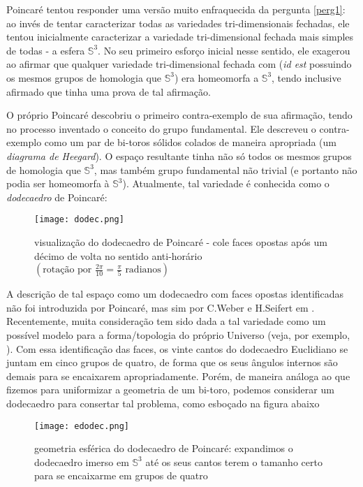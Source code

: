 Poincaré tentou responder uma versão muito enfraquecida da pergunta \cref{perg1}: ao invés de tentar caracterizar todas as variedades tri-dimensionais fechadas, ele tentou inicialmente caracterizar a variedade tri-dimensional fechada mais simples de todas - a esfera $\mathbb{S}^3$. No seu primeiro esforço inicial nesse sentido, ele exagerou ao afirmar que qualquer variedade tri-dimensional fechada com  (\emph{id est} possuindo os mesmos grupos de homologia que $\mathbb{S}^3$) era homeomorfa a $\mathbb{S}^3$, tendo inclusive afirmado que tinha uma prova de tal afirmação. \par 
O próprio Poincaré descobriu o primeiro contra-exemplo de sua afirmação, tendo no processo inventado o conceito do grupo fundamental.  Ele descreveu o contra-exemplo como um par de bi-toros sólidos colados de maneira apropriada (um \emph{diagrama de Heegard}). O espaço resultante tinha não só todos os mesmos grupos de homologia que $\mathbb{S}^3$, mas também grupo fundamental não trivial (e portanto não podia ser homeomorfa à $\mathbb{S}^3$). Atualmente, tal variedade é conhecida como o \emph{dodecaedro} de Poincaré: 
\begin{figure}[H]
\centering
\texttt{[image: dodec.png]}
\caption{visualização do dodecaedro de Poincaré - cole faces opostas após um décimo de volta no sentido anti-horário $\left(\text{rotação por $\frac{2 \pi}{10} = \frac{\pi}{5}$ radianos} \right)$}
\end{figure}
A descrição de tal espaço como um dodecaedro com faces opostas identificadas não foi introduzida por Poincaré, mas sim por C.Weber e H.Seifert em . Recentemente, muita consideração tem sido dada a tal variedade como um possível modelo para a forma/topologia do próprio Universo (veja, por exemplo, ). Com essa identificação das faces, os vinte cantos do dodecaedro Euclidiano se juntam em cinco grupos de quatro, de forma que os seus ângulos internos são  demais para se encaixarem apropriadamente. Porém, de maneira análoga ao que fizemos para uniformizar a geometria de um bi-toro, podemos considerar um dodecaedro  para consertar tal problema, como esboçado na figura abaixo

\begin{figure}[H]
\centering
\texttt{[image: edodec.png]}
\caption{geometria esférica do dodecaedro de Poincaré: expandimos o dodecaedro imerso em $\mathbb{S}^3$ até os seus cantos terem o tamanho certo para se encaixarme em grupos de quatro}
\end{figure}

